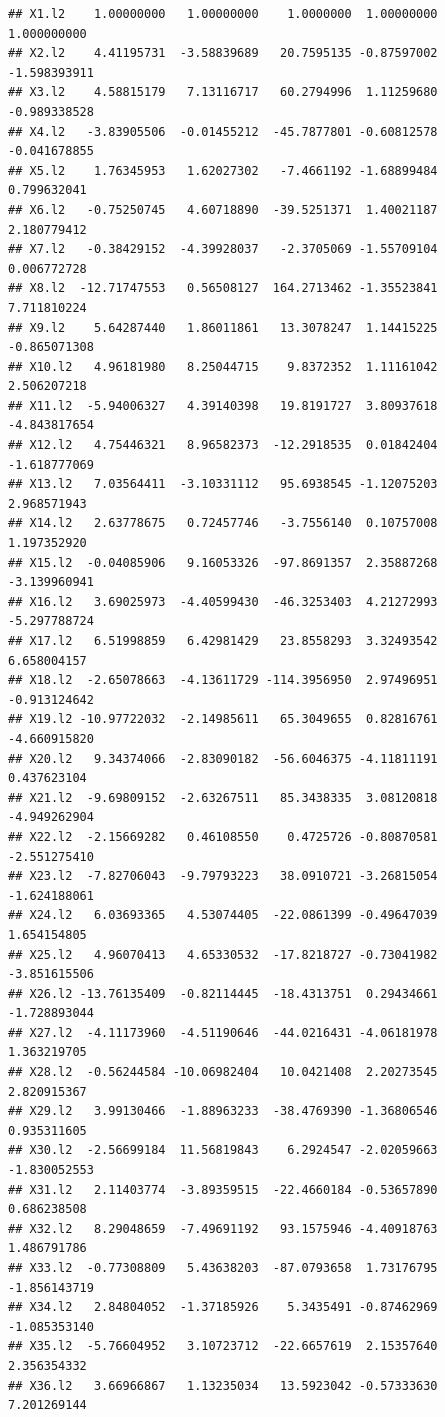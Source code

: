 \documentclass[]{article}
\begin{document}
\begin{verbatim}
## X1.l2    1.00000000   1.00000000    1.0000000  1.00000000  1.000000000
## X2.l2    4.41195731  -3.58839689   20.7595135 -0.87597002 -1.598393911
## X3.l2    4.58815179   7.13116717   60.2794996  1.11259680 -0.989338528
## X4.l2   -3.83905506  -0.01455212  -45.7877801 -0.60812578 -0.041678855
## X5.l2    1.76345953   1.62027302   -7.4661192 -1.68899484  0.799632041
## X6.l2   -0.75250745   4.60718890  -39.5251371  1.40021187  2.180779412
## X7.l2   -0.38429152  -4.39928037   -2.3705069 -1.55709104  0.006772728
## X8.l2  -12.71747553   0.56508127  164.2713462 -1.35523841  7.711810224
## X9.l2    5.64287440   1.86011861   13.3078247  1.14415225 -0.865071308
## X10.l2   4.96181980   8.25044715    9.8372352  1.11161042  2.506207218
## X11.l2  -5.94006327   4.39140398   19.8191727  3.80937618 -4.843817654
## X12.l2   4.75446321   8.96582373  -12.2918535  0.01842404 -1.618777069
## X13.l2   7.03564411  -3.10331112   95.6938545 -1.12075203  2.968571943
## X14.l2   2.63778675   0.72457746   -3.7556140  0.10757008  1.197352920
## X15.l2  -0.04085906   9.16053326  -97.8691357  2.35887268 -3.139960941
## X16.l2   3.69025973  -4.40599430  -46.3253403  4.21272993 -5.297788724
## X17.l2   6.51998859   6.42981429   23.8558293  3.32493542  6.658004157
## X18.l2  -2.65078663  -4.13611729 -114.3956950  2.97496951 -0.913124642
## X19.l2 -10.97722032  -2.14985611   65.3049655  0.82816761 -4.660915820
## X20.l2   9.34374066  -2.83090182  -56.6046375 -4.11811191  0.437623104
## X21.l2  -9.69809152  -2.63267511   85.3438335  3.08120818 -4.949262904
## X22.l2  -2.15669282   0.46108550    0.4725726 -0.80870581 -2.551275410
## X23.l2  -7.82706043  -9.79793223   38.0910721 -3.26815054 -1.624188061
## X24.l2   6.03693365   4.53074405  -22.0861399 -0.49647039  1.654154805
## X25.l2   4.96070413   4.65330532  -17.8218727 -0.73041982 -3.851615506
## X26.l2 -13.76135409  -0.82114445  -18.4313751  0.29434661 -1.728893044
## X27.l2  -4.11173960  -4.51190646  -44.0216431 -4.06181978  1.363219705
## X28.l2  -0.56244584 -10.06982404   10.0421408  2.20273545  2.820915367
## X29.l2   3.99130466  -1.88963233  -38.4769390 -1.36806546  0.935311605
## X30.l2  -2.56699184  11.56819843    6.2924547 -2.02059663 -1.830052553
## X31.l2   2.11403774  -3.89359515  -22.4660184 -0.53657890  0.686238508
## X32.l2   8.29048659  -7.49691192   93.1575946 -4.40918763  1.486791786
## X33.l2  -0.77308809   5.43638203  -87.0793658  1.73176795 -1.856143719
## X34.l2   2.84804052  -1.37185926    5.3435491 -0.87462969 -1.085353140
## X35.l2  -5.76604952   3.10723712  -22.6657619  2.15357640  2.356354332
## X36.l2   3.66966867   1.13235034   13.5923042 -0.57333630  7.201269144

\end{verbatim}
\end{document}
